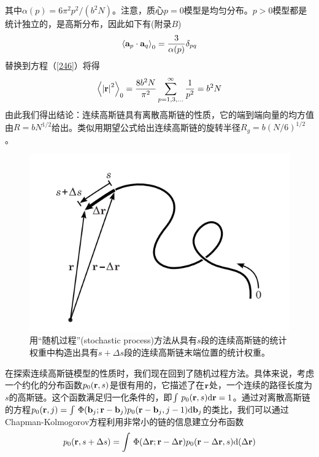 其中$\alpha (p)=6\pi ^2p^2/(b^2N)$。注意，质心$p=0$模型是均匀分布。$p>0$模型都是统计独立的，是高斯分布，因此如下有(附录$B$)
\begin{equation}\label{256}
\left \langle \mathbf{a} _p \cdot \mathbf{a} _q \right \rangle _0=\frac{3}{\alpha (p)}\delta _{pq}
\end{equation}
替换到方程（\ref{246}）将得
\begin{equation}\label{257}
\left \langle \left| \mathbf{r}  \right|^2 \right \rangle _0=\frac{8b^2N}{\pi ^2}\sum_{p=1,3,...}^{\infty}\frac{1}{p^2}=b^2N
\end{equation}
由此我们得出结论：连续高斯链具有离散高斯链的性质，它的端到端向量的均方值由$R=bN^{1/2}$给出。类似用期望公式给出连续高斯链的旋转半径$R_g=b(N/6)^{1/2}$。

\begin{figure}[H]
\centering
\includegraphics[scale=0.7]{Contents/chapter2/figures/42.png}
\caption{用“随机过程”(stochastic process)方法从具有$s$段的连续高斯链的统计权重中构造出具有$s+\Delta s$段的连续高斯链末端位置的统计权重。} \label{随机过程}
\end{figure}

在探索连续高斯链模型的性质时，我们现在回到了随机过程方法。具体来说，考虑一个约化的分布函数$p_0 (\mathbf{r} ,s)$是很有用的，它描述了在$\mathbf{r}$处，一个连续的路径长度为$s$的高斯链。这个函数满足归一化条件的，即$\int \,p_0(\mathbf{r} ,s) \mathrm{d} \mathbf{r} =1$。通过对离散高斯链的方程$p_0(\mathbf{r} ,j)=\int \,\Phi(\mathbf{b} _j;\mathbf{r} -\mathbf{b} _j)p_0(\mathbf{r} -\mathbf{b} _j,j-1) \mathrm{d} \mathbf{b} _j$的类比，我们可以通过Chapman-Kolmogorov方程利用非常小的链的信息建立分布函数
\begin{equation}\label{258}
p_0(\mathbf{r} ,s+\Delta s)=\int \,\Phi(\Delta \mathbf{r} ;\mathbf{r} -\Delta \mathbf{r} )p_0(\mathbf{r} -\Delta \mathbf{r} ,s) \mathrm{d}(\Delta \mathbf{r} ) 
\end{equation}

